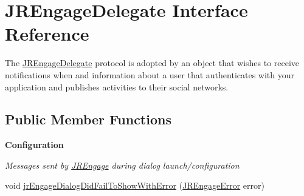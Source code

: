 \hypertarget{interfacecom_1_1janrain_1_1android_1_1engage_1_1_j_r_engage_delegate}{
\section{JREngageDelegate Interface Reference}
\label{interfacecom_1_1janrain_1_1android_1_1engage_1_1_j_r_engage_delegate}
}


The \hyperlink{interfacecom_1_1janrain_1_1android_1_1engage_1_1_j_r_engage_delegate}{JREngageDelegate} protocol is adopted by an object that wishes to receive notifications when and information about a user that authenticates with your application and publishes activities to their social networks.  


\subsection*{Public Member Functions}
\begin{Indent}{\bf Configuration}\par
{\em \label{_amgrp254f642527b45bc260048e30704edb39}
 Messages sent by \hyperlink{classcom_1_1janrain_1_1android_1_1engage_1_1_j_r_engage}{JREngage} during dialog launch/configuration }\begin{DoxyCompactItemize}
\item 
void \hyperlink{interfacecom_1_1janrain_1_1android_1_1engage_1_1_j_r_engage_delegate_acd5e5b9fdaeeec8deca0cf60ae3f2ec7}{jrEngageDialogDidFailToShowWithError} (\hyperlink{classcom_1_1janrain_1_1android_1_1engage_1_1_j_r_engage_error}{JREngageError} error)
\end{DoxyCompactItemize}
\end{Indent}
